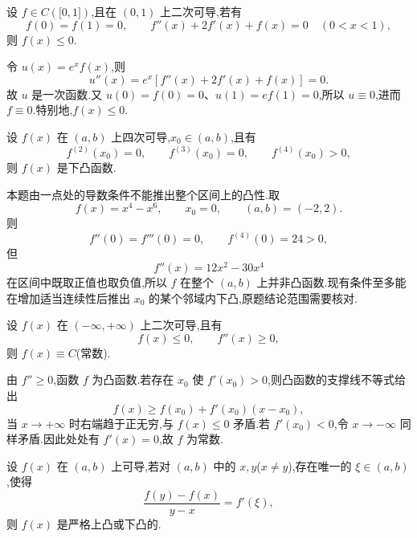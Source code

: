 \begin{example}
    设 $f\in C(\lbrack 0,1\rbrack)$,且在 $(0,1)$ 上二次可导,若有
    \[
        f(0)=f(1)=0,
        \qquad f''(x)+2f'(x)+f(x)=0\quad(0<x<1),
    \]
    则 $f(x)\leq0$.
\end{example}
\exampleblank

\begin{solution}
    令 $u(x)=e^x f(x)$,则
    \[
        u''(x)=e^x[f''(x)+2f'(x)+f(x)]=0.
    \]
    故 $u$ 是一次函数.又 $u(0)=f(0)=0$、$u(1)=ef(1)=0$,所以 $u\equiv0$,进而 $f\equiv0$.特别地,$f(x)\leq0$.
\end{solution}

\begin{example}
    设 $f(x)$ 在 $(a,b)$ 上四次可导,$x_0\in(a,b)$,且有
    \[
        f^{(2)}(x_0)=0,
        \qquad f^{(3)}(x_0)=0,
        \qquad f^{(4)}(x_0)>0,
    \]
    则 $f(x)$ 是下凸函数.
\end{example}
\exampleblank

\begin{solution}
    本题由一点处的导数条件不能推出整个区间上的凸性.取
    \[
        f(x)=x^4-x^6,
        \qquad x_0=0,
        \qquad (a,b)=(-2,2).
    \]
    则
    \[
        f''(0)=f'''(0)=0,
        \qquad f^{(4)}(0)=24>0,
    \]
    但
    \[
        f''(x)=12x^2-30x^4
    \]
    在区间中既取正值也取负值,所以 $f$ 在整个 $(a,b)$ 上并非凸函数.现有条件至多能在增加适当连续性后推出 $x_0$ 的某个邻域内下凸,原题结论范围需要核对.
\end{solution}

\begin{example}
    设 $f(x)$ 在 $(-\infty,+\infty)$ 上二次可导,且有
    \[
        f(x)\leq0,
        \qquad f''(x)\geq0,
    \]
    则 $f(x)\equiv C$(常数).
\end{example}
\exampleblank

\begin{solution}
    由 $f''\geq0$,函数 $f$ 为凸函数.若存在 $x_0$ 使 $f'(x_0)>0$,则凸函数的支撑线不等式给出
    \[
        f(x)\geq f(x_0)+f'(x_0)(x-x_0),
    \]
    当 $x\to+\infty$ 时右端趋于正无穷,与 $f(x)\leq0$ 矛盾.若 $f'(x_0)<0$,令 $x\to-\infty$ 同样矛盾.因此处处有 $f'(x)=0$,故 $f$ 为常数.
\end{solution}

\begin{example}
    设 $f(x)$ 在 $(a,b)$ 上可导,若对 $(a,b)$ 中的 $x,y$($x\neq y$),存在唯一的 $\xi\in(a,b)$,使得
    \[
        \dfrac{f(y)-f(x)}{y-x}=f'(\xi),
    \]
    则 $f(x)$ 是严格上凸或下凸的.
\end{example}
\exampleblank

